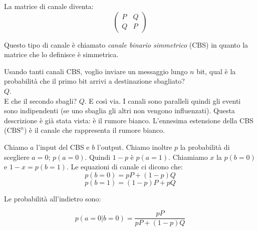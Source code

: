 La matrice di canale diventa:
\begin{equation*}
\begin{pmatrix}
P & Q\\
Q & P 
\end{pmatrix}
\end{equation*}

Questo tipo di canale è chiamato \textit{canale binario simmetrico} (CBS) in quanto la matrice che lo definisce è simmetrica.

Usando tanti canali CBS, voglio inviare un messaggio lungo $n$ bit, qual è la probabilità che il primo bit arrivi a destinazione sbagliato?\\
$Q$.\\
E che il secondo sbagli? $Q$. E così via.
I canali sono paralleli quindi gli eventi sono indipendenti (se uno sbaglia gli altri non vengono influenzati).
Questa descrizione è già stata vista: è il rumore bianco.
L'ennesima estensione della CBS ($\text{CBS}^n$) è il canale che rappresenta il rumore bianco.

Chiamo $a$ l'input del CBS e $b$ l'output. Chiamo inoltre $p$ la probabilità di scegliere $a=0$; $p(a=0)$.
Quindi $1-p$ è $p(a=1)$.
Chiamiamo $x$ la $p(b=0)$ e $1-x = p(b=1)$.
Le equazioni di canale ci dicono che:
\begin{equation*}
p(b=0) = pP + (1-p)Q
\end{equation*}
\begin{equation*}
p(b=1) = (1-p)P + pQ
\end{equation*}

Le probabilità all'indietro sono:

\begin{equation*}
p(a=0|b=0) = \frac{pP}{pP+(1-p)Q}
\end{equation*}


